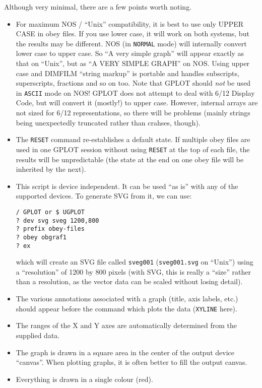 \documentclass[a4paper,twoside,11pt]{article}
\newcommand{\newpara}{\par\vspace{4mm}\noindent}
\begin{document}
\newpara
Although very minimal, there are a few points worth noting.

\begin{itemize}
\item For maximum NOS / ``Unix'' compatibility, it is best to use only UPPER CASE in obey files.
If you use lower case, it will work on both systems, but the results may be different. 
NOS (in \texttt{NORMAL} mode) will internally convert lower case to upper case. 
So ``A very simple graph'' will appear exactly as that on ``Unix'', but as ``A VERY SIMPLE GRAPH'' on NOS. 
Using upper case and DIMFILM ``string markup'' is portable and handles subscripts, superscripts, 
fractions and so on too. Note that GPLOT should \emph{not} be used in \texttt{ASCII} mode on NOS! 
GPLOT does not attempt to deal with 6/12 Display Code, but will convert it (mostly!) to upper case. 
However, internal arrays are not sized for 6/12 representations, so there will be problems 
(mainly strings being unexpectedly truncated rather than crahses, though).
\item The \texttt{RESET} command re-establishes a default state. If multiple obey files are used in one GPLOT session
without using \texttt{RESET} at the top of each file, the results will be unpredictable (the state 
at the end on one obey file will be inherited by the next).
\item This script is device independent. It can be used ``as is'' with any of the supported devices.
To generate SVG from it, we can use:
\begin{lstlisting}
/ GPLOT or $ UGPLOT
? dev svg sveg 1200,800
? prefix obey-files
? obey obgraf1
? ex
\end{lstlisting}
which will create an SVG file called \texttt{sveg001} (\texttt{sveg001.svg} on ``Unix'') using a 
``resolution'' of 1200 by 800 pixels (with SVG, this is
really a ``size'' rather than a resolution, as the vector data can be scaled without losing detail).
\item The various annotations associated with a graph (title, axis labels, etc.) should appear before the command which plots the data
(\texttt{XYLINE} here).
\item The ranges of the X and Y axes are automatically determined from the supplied data.
\item The graph is drawn in a square area in the center of the output device ``canvas''. 
When plotting graphs, it is often better to fill the output canvas.
\item Everything is drawn in a single colour (red).
\end{itemize}
\end{document}
